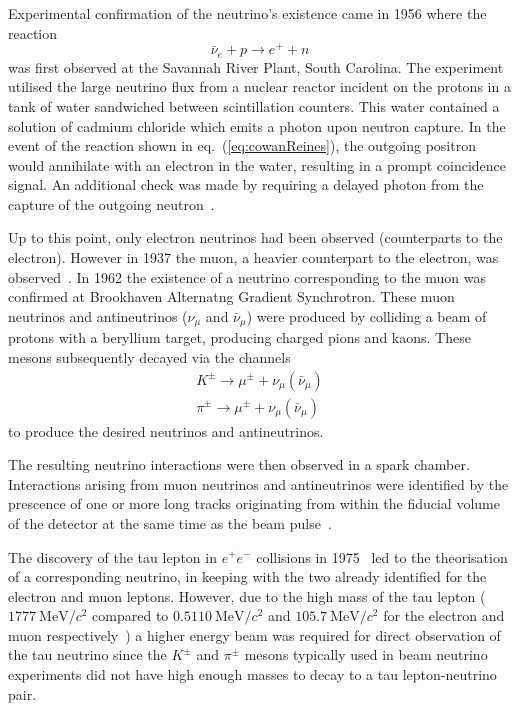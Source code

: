 Experimental confirmation of the neutrino's existence came in 1956 where the reaction
\begin{equation}
  \bar{\nu}_{e} + p \rightarrow e^{+} + n
  \label{eq:cowanReines}
\end{equation}
was first observed at the Savannah River Plant, South Carolina. The experiment utilised the large neutrino flux from a nuclear reactor incident on the protons in a tank of water sandwiched between scintillation counters.
This water contained a solution of cadmium chloride which emits a photon upon neutron capture.
In the event of the reaction shown in eq.~(\ref{eq:cowanReines}), the outgoing positron would annihilate with an electron in the water, resulting in a prompt coincidence signal.
An additional check was made by requiring a delayed photon from the capture of the outgoing neutron~\cite{cowanReines}.

Up to this point, only electron neutrinos had been observed (counterparts to the electron).
However in 1937 the muon, a heavier counterpart to the electron, was observed~\cite{muonDiscovery}.
In 1962 the existence of a neutrino corresponding to the muon was confirmed at Brookhaven Alternatng Gradient Synchrotron.
These muon neutrinos and antineutrinos ($\nu_{\mu}$ and $\bar{\nu}_{\mu}$) were produced by colliding a beam of protons with a beryllium target, producing charged pions and kaons.
These mesons subsequently decayed via the channels
\begin{align}
    K^{\pm} \rightarrow \mu^{\pm} + \nu_{\mu}(\bar{\nu}_{\mu}) \\
    \pi^{\pm} \rightarrow \mu^{\pm} + \nu_{\mu}(\bar{\nu}_{\mu})
\end{align}
to produce the desired neutrinos and antineutrinos.

The resulting neutrino interactions were then observed in a spark chamber.
Interactions arising from muon neutrinos and antineutrinos were identified by the prescence of one or more long tracks originating from within the fiducial volume of the detector at the same time as the beam pulse~\cite{numuDiscovery}.   


The discovery of the tau lepton in $e^{+}e^{-}$ collisions in 1975~\cite{tauLepton} led to the theorisation of a corresponding neutrino, in keeping with the two already identified for the electron and muon leptons.
However, due to the high mass of the tau lepton ($1777~\text{MeV}/c^{2}$ compared to $0.5110~\text{MeV}/c^{2}$ and $105.7~\text{MeV}/c^{2}$ for the electron and muon respectively~\cite{pdg2018}) a higher energy beam was required for direct observation of the tau neutrino since the $K^{\pm}$ and $\pi^{\pm}$ mesons typically used in beam neutrino experiments did not have high enough masses to decay to a tau lepton-neutrino pair.

